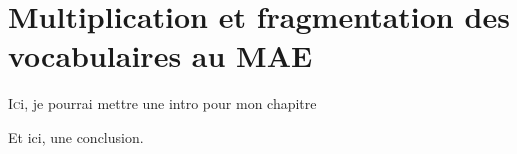 \chapter[Les vocabulaires contrôlés au MAE]{\label{II-A} Multiplication et fragmentation des vocabulaires au MAE}

\lettrine{I}ci, je pourrai mettre une intro pour mon chapitre






\bigskip
\bigskip
\bigskip

Et ici, une conclusion.